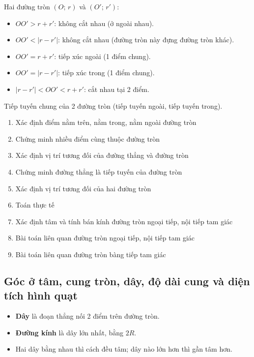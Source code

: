 \documentclass[12pt,a4paper]{article}
\begin{document}
\begin{tinhchat}[title={Vị trí tương đối của hai đường tròn}]
  Hai đường tròn $(O;\, r)$ và $(O';\, r')$:
  \begin{itemize}
    \item $OO' > r + r'$: không cắt nhau (ở ngoài nhau).
    \item $OO' < |r - r'|$: không cắt nhau (đường tròn này đựng đường tròn khác).
    \item $OO' = r + r'$: tiếp xúc ngoài (1 điểm chung).
    \item $OO' = |r - r'|$: tiếp xúc trong (1 điểm chung).
    \item $|r - r'| < OO' < r + r'$: cắt nhau tại 2 điểm.
  \end{itemize}
  Tiếp tuyến chung của 2 đường tròn (tiếp tuyến ngoài, tiếp tuyến trong).
\end{tinhchat}

\begin{enumerate}[label=\textbf{Dạng \arabic*:}, leftmargin=*, align=left]
  \item Xác định điểm nằm trên, nằm trong, nằm ngoài đường tròn
  \item Chứng minh nhiều điểm cùng thuộc đường tròn
  \item Xác định vị trí tương đối của đường thẳng và đường tròn
  \item Chứng minh đường thẳng là tiếp tuyến của đường tròn
  \item Xác định vị trí tương đối của hai đường tròn
  \item Toán thực tế
  \item Xác định tâm và tính bán kính đường tròn ngoại tiếp, nội tiếp tam giác
  \item Bài toán liên quan đường tròn ngoại tiếp, nội tiếp tam giác
  \item Bài toán liên quan đường tròn bàng tiếp tam giác
\end{enumerate}

\subsection{Góc ở tâm, cung tròn, dây, độ dài cung và diện tích hình quạt}

\begin{dinhnghia}
  \begin{itemize}
    \item \textbf{Dây} là đoạn thẳng nối 2 điểm trên đường tròn.
    \item \textbf{Đường kính} là dây lớn nhất, bằng $2R$.
    \item Hai dây bằng nhau thì cách đều tâm; dây nào lớn hơn thì gần tâm hơn.
  \end{itemize}
\end{dinhnghia}
\end{document}
